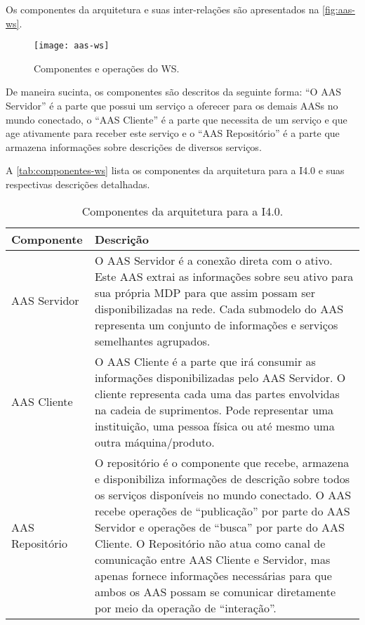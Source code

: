 	Os componentes da arquitetura e suas inter-relações são apresentados na \autoref{fig:aas-ws}.
	
	\begin{figure}[htb]
		\centering
		\caption{Componentes e operações do WS.}
		\label{fig:aas-ws}
		\texttt{[image: aas-ws]}
	\end{figure}

	De maneira sucinta, os componentes são descritos da seguinte forma: ``O AAS Servidor'' é a parte que possui um serviço a oferecer para os demais AASs no mundo conectado, o ``AAS Cliente'' é a parte que necessita de um serviço e que age ativamente para receber este serviço e o ``AAS Repositório'' é a parte que armazena informações sobre descrições de diversos serviços.
	
	A \autoref{tab:componentes-ws} lista os componentes da arquitetura para a I4.0 e suas respectivas descrições detalhadas.
	
	\begin{table}[htb]
		\centering
		\caption{Componentes da arquitetura para a I4.0.}
		\label{tab:componentes-ws}
		\begin{tabular}{p{3cm}p{12cm}}
			\hline
			\textbf{Componente}
			& \textbf{Descrição} \\ 
			
			\hline
			AAS Servidor
			& O AAS Servidor é a conexão direta com o ativo. Este AAS extrai as informações sobre seu ativo para sua própria MDP para que assim possam ser disponibilizadas na rede. Cada submodelo do AAS representa um conjunto de informações e serviços semelhantes agrupados. \\
			
			\hline
			AAS Cliente
			& O AAS Cliente é a parte que irá consumir as informações disponibilizadas pelo AAS Servidor. O cliente representa cada uma das partes envolvidas na cadeia de suprimentos. Pode representar uma instituição, uma pessoa física ou até mesmo uma outra máquina/produto. \\
			
			\hline
			AAS Repositório
			& O repositório é o componente que recebe, armazena e disponibiliza informações de descrição sobre todos os serviços disponíveis no mundo conectado. O AAS recebe operações de ``publicação'' por parte do AAS Servidor e operações de ``busca'' por parte do AAS Cliente. O Repositório não atua como canal de comunicação entre AAS Cliente e Servidor, mas apenas fornece informações necessárias para que ambos os AAS possam se comunicar diretamente por meio da operação de ``interação''. \\
			
			\hline
		\end{tabular}
	\end{table}
	
